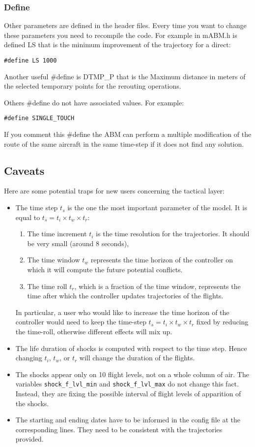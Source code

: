 \documentclass[12pt]{article}
\begin{document}
\subsubsection{Define}

Other parameters are defined in the header files. Every time you want to change these parameters you need to recompile the code. For example in mABM.h is defined LS that is the minimum improvement of the trajectory for a direct:
\begin{verbatim}
#define LS 1000
\end{verbatim}

Another useful \#define is DTMP\_P that is the Maximum distance in meters of the selected temporary points for the rerouting operations.

Others \#define do not have associated values. For example:
\begin{verbatim}
#define SINGLE_TOUCH
\end{verbatim}

If you comment this \#define the ABM can perform a multiple modification of the route of the same aircraft in the same time-step if it does not find any solution.


\subsection{Caveats}
\label{subsec:caveats}

Here are some potential traps for new users concerning the tactical layer:
\begin{itemize}
\item The time step $t_s$ is the one the most important parameter of the model. It is equal to $t_s = t_i \times t_w\times t_r$:
\begin{enumerate}
\item The time increment $t_i$ is the time resolution for the trajectories. It should be very small (around 8 seconds),
\item The time window $t_w$ represents the time horizon of the controller on which it will compute the future potential conflicts.
\item The time roll $t_r$, which is a fraction of the time window, represents the time after which the controller updates trajectories of the flights.
\end{enumerate}
In particular, a user who would like to increase the time horizon of the controller would need to keep the time-step $t_s = t_i \times t_w\times t_r$ fixed by reducing the time-roll, otherwise different effects will mix up.
\item The life duration of shocks is computed with respect to the time step. Hence changing $t_i$, $t_w$, or $t_r$ will change the duration of the flights.
\item The shocks appear only on 10 flight levels, not on a whole column of air. The variables \verb|shock_f_lvl_min| and \verb|shock_f_lvl_max| do not change this fact. Instead, they are fixing the possible interval of flight levels of apparition of the shocks.
\item The starting and ending dates have to be informed in the config file at the corresponding lines. They need to be consistent with the trajectories provided. 
\end{itemize}
\end{document}
